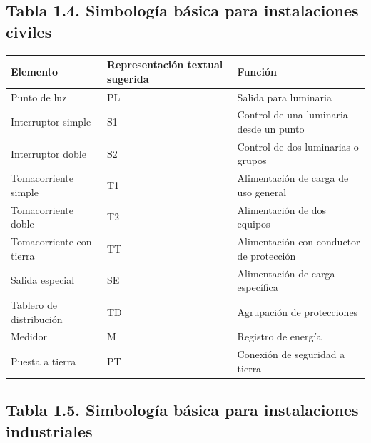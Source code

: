 \documentclass[
  spanish,
  letterpaper,
  DIV=11,
  numbers=noendperiod]{scrreprt}
\newcounter{none} %
\begin{document}
\subsection{Tabla 1.4. Simbología básica para instalaciones
civiles}\label{tabla-1.4.-simbologuxeda-buxe1sica-para-instalaciones-civiles}

{\def\LTcaptype{none} %
\begin{longtable}[]{@{}
  >{\raggedright\arraybackslash}p{}
  >{\raggedright\arraybackslash}p{}
  >{\raggedright\arraybackslash}p{}@{}}
\toprule\noalign{}
\begin{minipage}[b]{\linewidth}\raggedright
Elemento
\end{minipage} & \begin{minipage}[b]{\linewidth}\raggedright
Representación textual sugerida
\end{minipage} & \begin{minipage}[b]{\linewidth}\raggedright
Función
\end{minipage} \\
\midrule\noalign{}
\endhead
\bottomrule\noalign{}
\endlastfoot
Punto de luz & PL & Salida para luminaria \\
Interruptor simple & S1 & Control de una luminaria desde un punto \\
Interruptor doble & S2 & Control de dos luminarias o grupos \\
Tomacorriente simple & T1 & Alimentación de carga de uso general \\
Tomacorriente doble & T2 & Alimentación de dos equipos \\
Tomacorriente con tierra & TT & Alimentación con conductor de
protección \\
Salida especial & SE & Alimentación de carga específica \\
Tablero de distribución & TD & Agrupación de protecciones \\
Medidor & M & Registro de energía \\
Puesta a tierra & PT & Conexión de seguridad a tierra \\
\end{longtable}
}

\subsection{Tabla 1.5. Simbología básica para instalaciones
industriales}\label{tabla-1.5.-simbologuxeda-buxe1sica-para-instalaciones-industriales}
\end{document}
